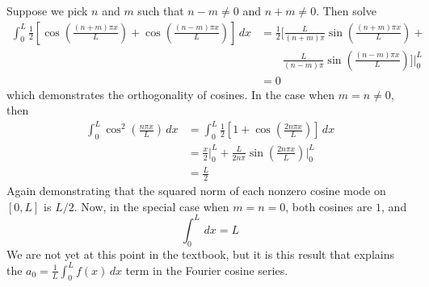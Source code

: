 \documentclass[a4paper]{article}
\begin{document}
\vspace{12pt}


Suppose we pick \( n \) and \( m \) such that \( n - m \neq 0 \) and \( n + m \neq 0 \). Then
solve
{\footnotesize
\begin{align*}
	\int^{L}_{0} \frac{1}{2}\!\left[ \cos\!\left(\frac{\!\left( n + m \right)\pi x}{L}\right) + \cos\!\left(\frac{\!\left( n - m \right)\pi x}{L}\right) \right] \, dx & = \frac{1}{2}\!\biggl[ \frac{L}{\!\left( n + m \right)\pi}\sin\!\left(\frac{\!\left( n + m \right)\pi x}{L}\right) + \\
																					   & \qquad \frac{L}{\!\left( n - m \right)\pi}\sin\!\left(\frac{\!\left( n - m \right)\pi x}{L}\right) \biggr]\Big|^{L}_{0} \\
	 & = 0
\end{align*}}
which demonstrates the orthogonality of cosines. In the case when \( m = n \neq 0 \), then
\begin{align*}
	\int^{L}_{0} \cos^{2}\!\left(\frac{n \pi x}{L}\right) \, dx & = \int^{L}_{0} \frac{1}{2}\!\left[ 1 + \cos\!\left(\frac{2n \pi x}{L}\right) \right] \, dx \\
	 & = \frac{x}{2}\Big|^{L}_{0} + \frac{L}{2n \pi}\sin\!\left(\frac{2n \pi x}{L}\right)\Big|^{L}_{0} \\
	 & = \frac{L}{2}
\end{align*}
Again demonstrating that the squared norm of each nonzero cosine mode on \( \!\left[ 0,L \right] \) is \( L / 2 \). Now, in the special case when \( m = n = 0 \), both cosines are \( 1 \), and
\[
	\int^{L}_{0} \, dx = L  
\]
We are not yet at this point in the textbook, but it is this result that explains the \( a_{0} = \frac{1}{L}\int^{L}_{0} f \!\left( x \right) \, dx \) term in the Fourier cosine series.

\newpage
\end{document}
